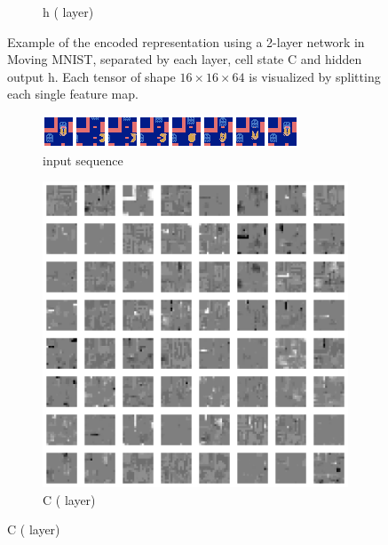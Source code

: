 \begin{figure}[h!tb]
\begin{subfigure}{0.24\textwidth}
  \caption{h \tiny{( layer)}}
  \label{fig:mm-lrep4}
  \vspace{.1cm}
\end{subfigure}
\caption[Encoded Representation in Moving MNIST]{Example of the encoded representation using a 2-layer network in Moving MNIST, separated by each layer, cell state C and hidden output h. Each tensor of shape $16 \times 16 \times 64$ is visualized by splitting each single feature map.}
\label{fig:mm-lrep}
\end{figure}

\begin{figure}[h!tb]
\centering
\begin{subfigure}{1.0\textwidth}
  \centering
  \includegraphics[width=0.92\linewidth]{figures/learned_rep/pac/inputs.png}
  \caption{input sequence}
  \label{fig:pac-lrep-inputs}
  \vspace{.1cm}
\end{subfigure}
\begin{subfigure}{0.24\textwidth}
  \centering
  \includegraphics[width=0.92\linewidth]{figures/learned_rep/pac/1c.png}
  \caption{C \tiny{( layer)}}
  \label{fig:pac-lrep1}
  \vspace{.1cm}
\end{subfigure}

\end{figure}
